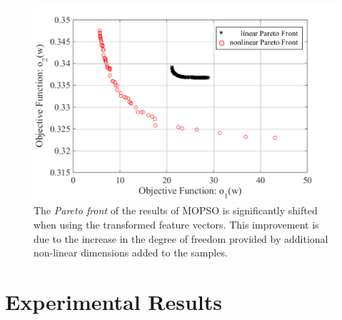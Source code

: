 \begin{figure}[t]
\centering
\includegraphics[scale=.6]{Fig/pareto_compare.pdf}
\caption{The \textit{Pareto front} of the results of MOPSO is significantly shifted when using the transformed feature vectors. This improvement is due to the increase in the degree of freedom provided by additional non-linear dimensions added to the samples.}
\label{fig:pareto_compare}
\end{figure}

\section{Experimental Results}\label{sec:result1}

